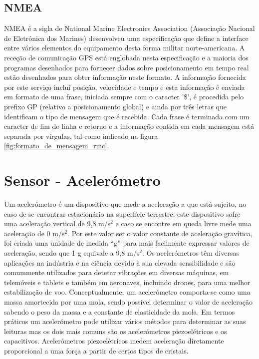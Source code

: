 \subsection{NMEA}
\label{sub:nmea}

NMEA é a sigla de National Marine Electronics Association (Associação Nacional de Eletrónica dos Marines) desenvolveu uma especificação que define a interface entre vários elementos do equipamento desta forma militar norte-americana.
A receção de comunicação GPS está englobada nesta especificação e a maioria dos programas desenhados para fornecer dados sobre posicionamento em tempo real estão desenhados para obter informação neste formato.
A informação fornecida por este serviço incluí posição, velocidade e tempo e esta informação é enviada em formato de uma frase, iniciada sempre com o caracter '\$', é procedida pelo prefixo GP (relativo a posicionamento global) e ainda por três letras que identificam o tipo de mensagem que é recebida.
Cada frase é terminada com um caracter de fim de linha e retorno e a informação contida em cada mensagem está separada por vírgulas, tal como indicado na figura \ref{fig:formato_de_mensagem_rmc}.

\section{Sensor - Acelerómetro}
\label{sec:acelerometro}

Um acelerómetro é um dispositivo que mede a aceleração a que está sujeito, no caso de se encontrar estacionário na superfície terrestre, este dispositivo sofre uma aceleração vertical de 9,8 m/s$^2$ e caso se encontre em queda livre mede uma aceleração de 0 m/s$^2$.
Por este valor ser o valor constante de aceleração gravítica, foi criada uma unidade de medida ``g'' para mais facilmente expressar valores de aceleração, sendo que 1 g equivale a 9,8 m/s$^2$.
Os acelerómetros têm diversas aplicações na indústria e na ciência devido à sua elevada sensibilidade e são comummente utilizados para detetar vibrações em diversas máquinas, em telemóveis e tablets e também em aeronaves, incluindo drones, para uma melhor estabilização de voo.
Conceptualmente, um acelerómetro comporta-se como uma massa amortecida por uma mola, sendo possível determinar o valor de aceleração sabendo o peso da massa e a constante de elasticidade da mola.
Em termos práticos um acelerómetro pode utilizar vários métodos para determinar as suas leituras mas os dois mais comuns são os acelerómetros piezoelétricos e os capacitivos.
Acelerómetros piezoelétricos medem aceleração diretamente proporcional a uma força a partir de certos tipos de cristais.

